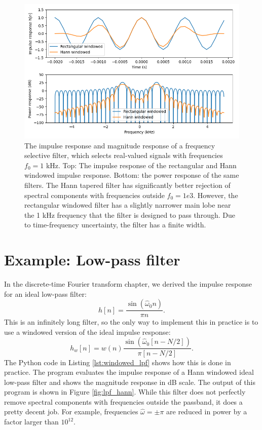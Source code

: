\begin{figure}
  \begin{center}
    \includegraphics[width=\textwidth]{code/022_window_functions/freq_filter.png}
  \end{center}
  \caption{ The impulse response and magnitude response of a frequency selective filter, which selects real-valued signals with frequencies $f_0=1$ kHz. Top: The impulse response of the rectangular and Hann windowed impulse response. Bottom: the power response of the same filters. The Hann tapered filter has significantly better rejection of spectral components with frequencies outside $f_0=1e3$. However, the rectangular windowed filter has a slightly narrower main lobe near the 1 kHz frequency that the filter is designed to pass through. Due to time-frequency uncertainty, the filter has a finite width.}
  \label{fig:frequency_selective}
\end{figure}




\section{Example: Low-pass filter}

In the discrete-time Fourier transform chapter, we derived the impulse response for an ideal low-pass filter:
\begin{equation}
  h[n] = \frac{\sin(\hat{\omega}_0 n)}{\pi n}.
\end{equation}
This is an infinitely long filter, so the only way to implement this
in practice is to use a windowed version of the ideal impulse
response:
\begin{equation}
  h_w[n] = w(n)\frac{\sin(\hat{\omega}_0 [n-N/2])}{\pi [n-N/2]}.
\end{equation}
The Python code in Listing \ref{lst:windowed_lpf} shows how this is
done in practice. The program evaluates the impulse response of a
Hann windowed ideal low-pass filter and shows the magnitude response
in dB scale. The output of this program is shown in Figure
\ref{fig:lpf_hann}. While this filter does not perfectly remove
spectral components with frequencies outside the passband, it does a
pretty decent job. For example, frequencies $\hat{\omega}=\pm \pi$ are
reduced in power by a factor larger than $10^{12}$.

